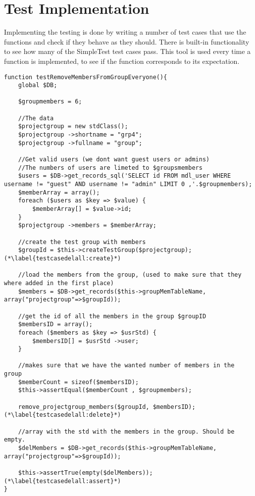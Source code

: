 \section{Test Implementation}
\label{sec:testimplementation}

Implementing the testing is done by writing a number of test cases that use the functions and check if they behave as they should.
There is built-in functionality to see how many of the SimpleTest test cases pass.
This tool is used every time a function is implemented, to see if the function corresponds to its expectation.

\begin{lstlisting}[style=phpCode, caption=\myCaption{A test case for the function remove\_projectgroup\_members. The test case tests if the function correctly removes all the members of the project group when instructed to.}, label=testcasedelall]
function testRemoveMembersFromGroupEveryone(){
    global $DB;
    
    $groupmembers = 6;
    
    //The data
    $projectgroup = new stdClass(); 
    $projectgroup ->shortname = "grp4";
    $projectgroup ->fullname = "group";
    
    //Get valid users (we dont want guest users or admins)
    //The numbers of users are limeted to $groupsmembers
    $users = $DB->get_records_sql('SELECT id FROM mdl_user WHERE username != "guest" AND username != "admin" LIMIT 0 ,'.$groupmembers);
    $memberArray = array();
    foreach ($users as $key => $value) {
        $memberArray[] = $value->id;
    }
    $projectgroup ->members = $memberArray;
    
    //create the test group with members
    $groupId = $this->createTestGroup($projectgroup); (*\label{testcasedelall:create}*)
    
    //load the members from the group, (used to make sure that they where added in the first place)
    $members = $DB->get_records($this->groupMemTableName, array("projectgroup"=>$groupId));
    
    //get the id of all the members in the group $groupID
    $membersID = array();
    foreach ($members as $key => $usrStd) {
        $membersID[] = $usrStd ->user;
    } 
    
    //makes sure that we have the wanted number of members in the group
    $memberCount = sizeof($membersID);
    $this->assertEqual($memberCount , $groupmembers);
    
    remove_projectgroup_members($groupId, $membersID); (*\label{testcasedelall:delete}*)
    
    //array with the std with the members in the group. Should be empty.
    $delMembers = $DB->get_records($this->groupMemTableName, array("projectgroup"=>$groupId));
    
    $this->assertTrue(empty($delMembers)); (*\label{testcasedelall:assert}*)
}
\end{lstlisting}

